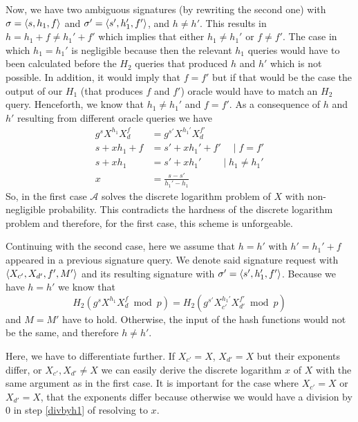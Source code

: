 Now, we have two ambiguous signatures (by rewriting the second one) with \(\sigma = \langle s, h_1, f \rangle\) and \(\sigma^\prime = \langle s', h_1', f' \rangle\), and \(h \neq h'\).
This results in \(h = h_1 + f \neq h_1' + f'\) which implies that either \(h_1 \neq h_1'\) or \(f \neq f'\).
The case in which \(h_1 = h_1'\) is negligible because then the relevant \(h_1\) queries would have to been calculated before the \(H_2\) queries that produced \(h\) and \(h'\) which is not possible.
In addition, it would imply that \(f = f'\) but if that would be the case the output of our \(H_1\) (that produces \(f\) and \(f'\)) oracle would have to match an \(H_2\) query.
Henceforth, we know that \(h_1 \neq h_1'\) and \(f = f'\).
As a consequence of \(h\) and \(h'\) resulting from different oracle queries we have
\begin{align}
  g^{s} X^{h_1} X_d^f &= g^{s'} X^{h_1'} X_d^{f'} \\
  s + x h_1 + f &= s' + x h_1' + f' \quad\mid f=f'\\
  s + x h_1 &= s' + x h_1' \qquad \mid h_1 \neq h_1' \label{divbyh1}\\
  x &= \frac{s-s'}{h_1' - h_1}
\end{align}
So, in the first case \(\mathcal{A}\) solves the discrete logarithm problem of \(X\) with non-negligible probability.
This contradicts the hardness of the discrete logarithm problem and therefore, for the first case, this scheme is unforgeable.

Continuing with the second case, here we assume that \(h = h'\) with \(h' = h_1' + f\) appeared in a previous signature query.
We denote said signature request with \(\langle X_{c'}, X_{d'}, f', M' \rangle\) and its resulting signature with \(\sigma' = \langle s', h_1', f' \rangle\).
Because we have \(h = h'\) we know that
  \[H_2(g^s X^{h_1} X_d^f \bmod p)  = H_2(g^{s'} X_{c'}^{h_1'} X_{d'}^{f'} \bmod p) \]
and \(M = M'\) have to hold.
Otherwise, the input of the hash functions would not be the same, and therefore \(h \neq h'\).

Here, we have to differentiate further.
If \(X_{c'} = X\), \(X_{d'} = X\) but their exponents differ, or \(X_{c'},X_{d'} \neq X\) we can easily derive the discrete logarithm \(x\) of \(X\) with the same argument as in the first case.
It is important for the case where \(X_{c'} = X\) or \(X_{d'} = X\), that the exponents differ because otherwise we would have a division by 0 in step \ref{divbyh1} of resolving to \(x\).

